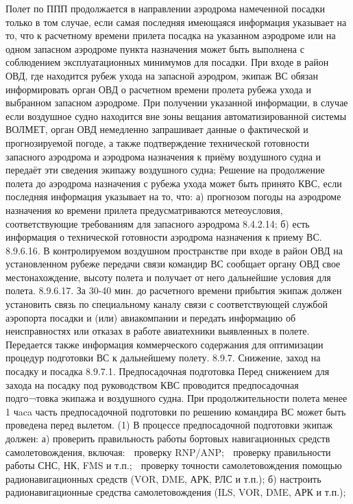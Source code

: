Полет по ППП продолжается в направлении аэродрома намеченной посадки только в том случае, если самая последняя имеющаяся информация указывает на то, что к расчетному времени прилета посадка на указанном аэродроме или на одном запасном аэродроме пункта назначения может быть выполнена с соблюдением эксплуатационных минимумов для посадки.
При входе в район ОВД, где находится рубеж ухода на запасной аэродром, экипаж ВС обязан информировать орган ОВД о расчетном времени пролета рубежа ухода и выбранном запасном аэродроме. При получении указанной информации, в случае если воздушное судно находится вне зоны вещания автоматизированной системы ВОЛМЕТ, орган ОВД немедленно запрашивает данные о фактической и прогнозируемой погоде, а также подтверждение технической готовности запасного аэродрома и аэродрома назначения к приёму воздушного судна и передаёт эти сведения экипажу воздушного судна;
Решение на продолжение полета до аэродрома назначения с рубежа ухода может быть принято КВС, если последняя информация указывает на то, что: 
а)	прогнозом погоды на аэродроме назначения ко времени прилета предусматриваются метеоусловия, соответствующие требованиям для запасного аэродрома 8.4.2.14; 
б)	есть информация о технической готовности аэродрома назначения к приему ВС.
8.9.6.16. В контролируемом воздушном пространстве при входе в район ОВД на установленном рубеже передачи связи командир ВС сообщает органу ОВД свое местонахождение, высоту полета и получает от него дальнейшие условия для полета.
8.9.6.17. За 30-40 мин. до расчетного времени прибытия экипаж должен установить связь по специальному каналу связи с соответствующей службой аэропорта посадки и (или) авиакомпании и передать информацию об неисправностях или отказах в работе авиатехники выявленных в полете. Передается также информация коммерческого содержания для оптимизации процедур подготовки ВС к дальнейшему полету.
8.9.7.	Снижение, заход на посадку и посадка
8.9.7.1.	Предпосадочная подготовка
Перед снижением для захода на посадку под руководством КВС проводится предпосадочная подго¬товка экипажа и воздушного судна. При продолжительности полета менее 1 чaca часть предпосадочной подготовки по решению командира ВС может быть проведена перед вылетом.
(1) В процессе предпосадочной подготовки экипаж должен:
а)	проверить правильность работы бортовых навигационных средств самолетовождения, включая:
	проверку RNP/ANP;
	проверку правильности работы СНС, НК, FMS и т.п.;
	проверку точности самолетовождения помощью радионавигационных средств (VOR, DME, АРК, РЛС и т.п.);
б)	настроить радионавигационные средства самолетовождения (ILS, VOR, DME, АРК и т.п.);
